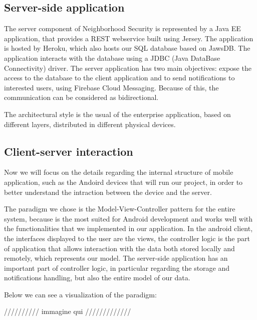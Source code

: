 \documentclass[a4paper]{scrreprt}
\begin{document}
\subsection{Server-side application}
The server component of Neighborhood Security is represented by a Java EE application, that provides a REST webservice built using Jersey. The application is hosted by Heroku, which also hosts our SQL database based on JawsDB. The application interacts with the database using a JDBC (Java DataBase Connectivity) driver. The server application has two main objectives: expose the access to the database to the client application and to send notifications to interested users, using Firebase Cloud Messaging. Because of this, the communication can be considered as bidirectional.
\par The architectural style is the usual of the enterprise application, based on different layers, distributed in different physical devices.

\subsection{Client-server interaction}
Now we will focus on the details regarding the internal structure of mobile application, such as the Andoird devices that will run our project, in order to better understand the intraction between the device and the server.
\par The paradigm we chose is the Model-View-Controller pattern for the entire system, because is the most suited for Android development and works well with the functionalities that we implemented in our application. In the android client, the interfaces displayed to the user are the views, the controller logic is the part of application that allows interaction with the data both stored locally and remotely, which represents our model. The server-side application has an important part of controller logic, in particular regarding the storage and notifications handling, but also the entire model of our data.
\par Below we can see a visualization of the paradigm:

////////// immagine qui /////////////
\end{document}
